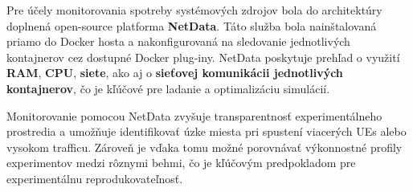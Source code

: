 Pre účely monitorovania spotreby systémových zdrojov bola do architektúry doplnená open-source platforma \textbf{NetData}. Táto služba bola nainštalovaná priamo do Docker hosta a nakonfigurovaná na sledovanie jednotlivých kontajnerov cez dostupné Docker plug-iny. NetData poskytuje prehľad o využití \textbf{RAM}, \textbf{CPU}, \textbf{siete}, ako aj o \textbf{sieťovej komunikácii jednotlivých kontajnerov}, čo je kľúčové pre ladanie a optimalizáciu simulácií. 

Monitorovanie pomocou NetData zvyšuje transparentnosť experimentálneho prostredia a umožňuje identifikovať úzke miesta pri spustení viacerých UEs alebo vysokom trafficu. Zároveň je vďaka tomu možné porovnávať výkonnostné profily experimentov medzi rôznymi behmi, čo je kľúčovým predpokladom pre experimentálnu reprodukovateľnosť.
